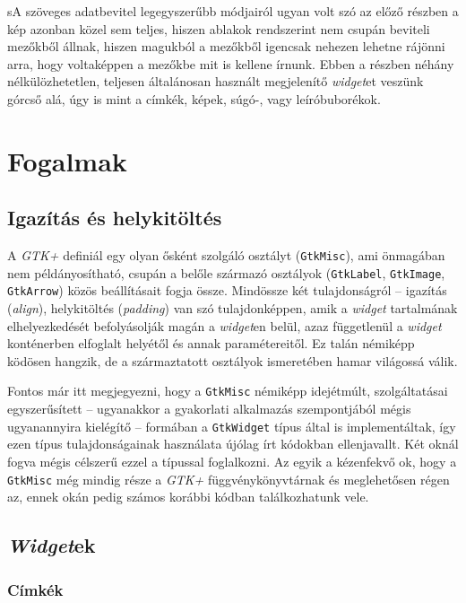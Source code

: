sA szöveges adatbevitel legegyszerűbb módjairól ugyan volt szó az előző részben a kép azonban közel sem teljes, hiszen ablakok rendszerint nem csupán beviteli mezőkből állnak, hiszen magukból a mezőkből igencsak nehezen lehetne rájönni arra, hogy voltaképpen a mezőkbe mit is kellene írnunk. Ebben a részben néhány nélkülözhetetlen, teljesen általánosan használt megjelenítő \textit{widget}et veszünk górcső alá, úgy is mint a címkék, képek, súgó-, vagy leíróbuborékok.

\section{Fogalmak}

\subsection{Igazítás és helykitöltés}

A \textit{GTK+} definiál egy olyan ősként szolgáló osztályt (\texttt{GtkMisc}), ami önmagában nem példányosítható, csupán a belőle származó osztályok (\texttt{GtkLabel}, \texttt{GtkImage}, \texttt{GtkArrow}) közös beállításait fogja össze. Mindössze két tulajdonságról -- igazítás (\textit{align}), helykitöltés (\textit{padding}) van szó tulajdonképpen, amik a \textit{widget} tartalmának elhelyezkedését befolyásolják magán a \textit{widget}en belül, azaz függetlenül a \textit{widget} konténerben elfoglalt helyétől és annak paramétereitől. Ez talán némiképp ködösen hangzik, de a származtatott osztályok ismeretében hamar világossá válik.

Fontos már itt megjegyezni, hogy a \texttt{GtkMisc} némiképp idejétmúlt, szolgáltatásai egyszerűsített -- ugyanakkor a gyakorlati alkalmazás szempontjából mégis ugyanannyira kielégítő -- formában a \texttt{GtkWidget} típus által is implementáltak, így ezen típus tulajdonságainak használata újólag írt kódokban ellenjavallt. Két oknál fogva mégis célszerű ezzel a típussal foglalkozni. Az egyik a kézenfekvő ok, hogy a \texttt{GtkMisc} még mindig része a \textit{GTK+} függvénykönyvtárnak és meglehetősen régen az, ennek okán pedig számos korábbi kódban találkozhatunk vele.

\subsection{\textit{Widget}ek}

\subsubsection{Címkék}

